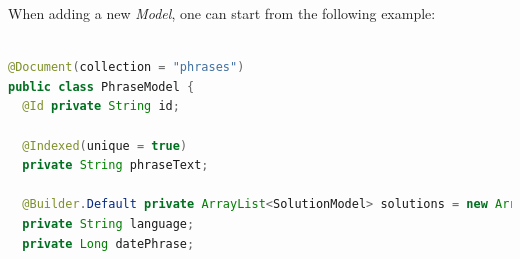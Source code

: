 When adding a new \textit{Model}, one can start from the following example:
\begin{lstlisting}[language=Java]

@Document(collection = "phrases")
public class PhraseModel {
  @Id private String id;

  @Indexed(unique = true)
  private String phraseText;

  @Builder.Default private ArrayList<SolutionModel> solutions = new ArrayList<>();
  private String language;
  private Long datePhrase;
 \end{lstlisting}
